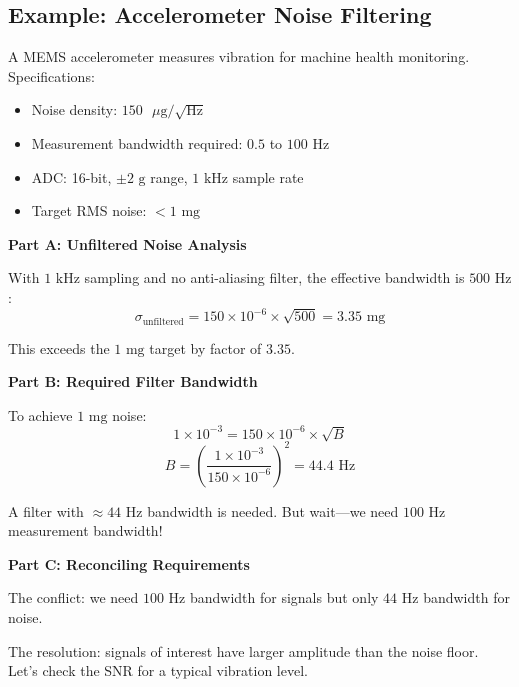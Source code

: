 \subsection{Example: Accelerometer Noise Filtering}
\label{ex:accel_filter}

\begin{example}

A MEMS accelerometer measures vibration for machine health monitoring. Specifications:
\begin{itemize}
    \item Noise density: $150\text{ }\mu\text{g}/\sqrt{\text{Hz}}$
    \item Measurement bandwidth required: $0.5$ to $100\text{ Hz}$
    \item ADC: 16-bit, $\pm 2\text{ g}$ range, $1\text{ kHz}$ sample rate
    \item Target RMS noise: $<1\text{ mg}$
\end{itemize}

\textbf{Part A: Unfiltered Noise Analysis}

With $1\text{ kHz}$ sampling and no anti-aliasing filter, the effective bandwidth is $500\text{ Hz}$:
\begin{equation}
\sigma_{\text{unfiltered}} = 150 \times 10^{-6} \times \sqrt{500} = 3.35\text{ mg}
\end{equation}

This exceeds the $1\text{ mg}$ target by factor of $3.35$.

\textbf{Part B: Required Filter Bandwidth}

To achieve $1\text{ mg}$ noise:
\begin{equation}
1 \times 10^{-3} = 150 \times 10^{-6} \times \sqrt{B}
\end{equation}
\begin{equation}
B = \left(\frac{1 \times 10^{-3}}{150 \times 10^{-6}}\right)^2 = 44.4\text{ Hz}
\end{equation}

A filter with $\approx 44\text{ Hz}$ bandwidth is needed. But wait---we need $100\text{ Hz}$ measurement bandwidth!

\textbf{Part C: Reconciling Requirements}

The conflict: we need $100\text{ Hz}$ bandwidth for signals but only $44\text{ Hz}$ bandwidth for noise.

The resolution: signals of interest have larger amplitude than the noise floor. Let's check the SNR for a typical vibration level.


\end{example}
